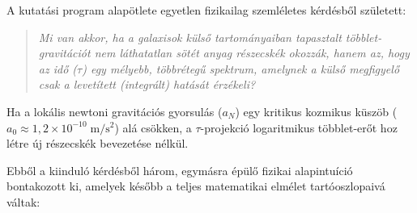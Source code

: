 \documentclass[11pt,a4paper]{article}
\begin{document}
A kutatási program alapötlete egyetlen fizikailag szemléletes kérdésb\H{o}l született:
\begin{quote}
\emph{Mi van akkor, ha a galaxisok küls\H{o} tartományaiban tapasztalt többlet-gravitációt nem láthatatlan sötét anyag részecskék okozzák, hanem az, hogy az id\H{o} ($\tau$) egy mélyebb, többréteg\H{u} spektrum, amelynek a küls\H{o} megfigyel\H{o} csak a levetített (integrált) hatását érzékeli?}
\end{quote}
Ha a lokális newtoni gravitációs gyorsulás ($a_N$) egy kritikus kozmikus küszöb ($a_0 \approx 1{,}2\times 10^{-10}\;\mathrm{m/s^2}$) alá csökken, a $\tau$-projekció logaritmikus többlet-er\H{o}t hoz létre új részecskék bevezetése nélkül.

Ebb\H{o}l a kiinduló kérdésb\H{o}l három, egymásra épül\H{o} fizikai alapintuíció bontakozott ki, amelyek kés\H{o}bb a teljes matematikai elmélet tartóoszlopaivá váltak:
\end{document}
